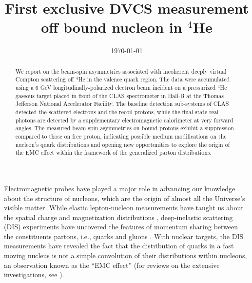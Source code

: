 \documentclass[twocolumn,nofootinbib,showpacs,prl,superscriptaddress,secnumarabic,amssymb,nobibnotes,aps,floatfix]{revtex4}
\begin{document}
\linenumbers

\title{First exclusive DVCS measurement off bound nucleon in $^4$He}



%
\date{\today}
\begin{abstract}
We report on the beam-spin asymmetries associated with incoherent deeply 
   virtual Compton scattering off $^4$He in the valence quark region. The data 
   were accumulated using a 6 GeV longitudinally-polarized electron beam 
   incident on a pressurized $^4$He gaseous target placed in front of the CLAS 
   spectrometer in Hall-B at the Thomas Jefferson National Accelerator 
   Facility.  The baseline detection sub-systems of CLAS detected the scattered 
   electrons and the recoil protons, while the final-state real photons are 
   detected by a supplementary electromagnetic calorimeter at very forward 
   angles. The measured beam-spin asymmetries on bound-protons exhibit a 
   suppression compared to those on free proton, indicating possible medium 
   modifications on the nucleon's quark distributions and opening new 
   opportunities to explore the origin of the EMC effect within the framework 
   of the generalized parton distributions.

\end{abstract}

\maketitle 

Electromagnetic probes have played a major role in advancing our knowledge 
about the structure of nucleons, which are the origin of almost all the
Universe's visible matter. While elastic lepton-nucleon measurements have 
taught us about the spatial charge and magnetization distributions 
\cite{Hofstadter:1955ae,Perdrisat:2006hj}, deep-inelastic scattering (DIS) 
experiments have uncovered the features of momentum sharing between the 
constituents partons, i.e., quarks and gluons \cite{Dokshitzer:1977sg,pdg}.  
With nuclear targets, the DIS measurements have revealed the fact that the 
distribution of quarks in a fast moving nucleus is not a simple convolution of 
their distributions within nucleons, an observation known as the ``EMC 
effect''\cite{EMC_first} (for reviews on the extensive investigations, see  
\cite{EMC_CERN,EMC_SLAC,EMC_HERMES,EMC_JLab,EMC_John,EMC_mdeium_1,EMC_medium_2}).
\end{document}
